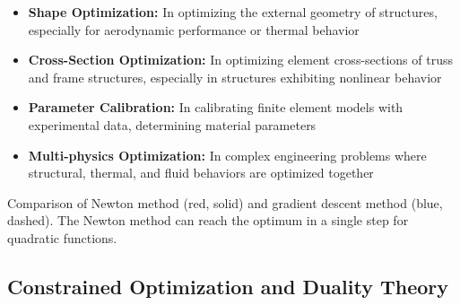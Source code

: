\begin{itemize}
    \item \textbf{Shape Optimization:} In optimizing the external geometry of structures, especially for aerodynamic performance or thermal behavior
    
    \item \textbf{Cross-Section Optimization:} In optimizing element cross-sections of truss and frame structures, especially in structures exhibiting nonlinear behavior
    
    \item \textbf{Parameter Calibration:} In calibrating finite element models with experimental data, determining material parameters
    
    \item \textbf{Multi-physics Optimization:} In complex engineering problems where structural, thermal, and fluid behaviors are optimized together
\end{itemize}

\begin{marginfigure}
\centering
{}
\caption{Comparison of Newton method (red, solid) and gradient descent method (blue, dashed). The Newton method can reach the optimum in a single step for quadratic functions.}
\label{fig:newton_vs_gradient}
\end{marginfigure}

\subsection{Constrained Optimization and Duality Theory}

